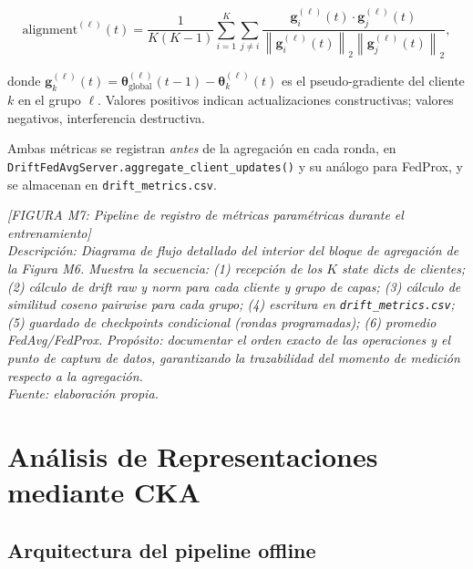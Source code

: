 \begin{equation}
  \text{alignment}^{(\ell)}(t) = \frac{1}{K(K-1)}
  \sum_{i=1}^{K} \sum_{j \neq i}
  \frac{\mathbf{g}_i^{(\ell)}(t) \cdot \mathbf{g}_j^{(\ell)}(t)}
  {\left\|\mathbf{g}_i^{(\ell)}(t)\right\|_2 \left\|\mathbf{g}_j^{(\ell)}(t)\right\|_2},
  \label{eq:cosine}
\end{equation}

donde $\mathbf{g}_k^{(\ell)}(t) = \boldsymbol{\theta}_{\text{global}}^{(\ell)}(t-1) -
\boldsymbol{\theta}_k^{(\ell)}(t)$ es el pseudo-gradiente del cliente $k$ en el grupo
$\ell$. Valores positivos indican actualizaciones constructivas; valores negativos,
interferencia destructiva.

Ambas métricas se registran \textit{antes} de la agregación en cada ronda, en
\texttt{DriftFedAvgServer.aggregate\_client\_updates()} y su análogo para FedProx, y se
almacenan en \texttt{drift\_metrics.csv}.

\begin{center}
\textit{[FIGURA M7: Pipeline de registro de métricas paramétricas durante el entrenamiento]}\\
\textit{Descripción: Diagrama de flujo detallado del interior del bloque de agregación de la}
\textit{Figura M6. Muestra la secuencia: (1) recepción de los $K$ state dicts de clientes;}
\textit{(2) cálculo de drift raw y norm para cada cliente y grupo de capas; (3) cálculo de}
\textit{similitud coseno pairwise para cada grupo; (4) escritura en \texttt{drift\_metrics.csv};}
\textit{(5) guardado de checkpoints condicional (rondas programadas); (6) promedio FedAvg/FedProx.}
\textit{Propósito: documentar el orden exacto de las operaciones y el punto de captura de datos,}
\textit{garantizando la trazabilidad del momento de medición respecto a la agregación.}\\
\textit{Fuente: elaboración propia.}
\end{center}

\section{Análisis de Representaciones mediante CKA}

\subsection{Arquitectura del pipeline offline}

